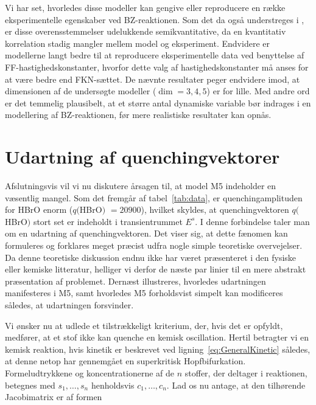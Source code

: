 Vi har set, hvorledes disse model\-ler kan gengive eller
reproducere en r{\ae}kke eksperimentelle egenskaber ved
BZ-reaktionen. Som det da ogs{\aa} understreges i
\cite{HopfQuench}, er disse overensstemmelser udelukkende
semikvantitative, da en kvantitativ korrelation stadig
mangler mellem model og eksperiment. Endvidere er
model\-lerne langt bedre til at reproducere eksperimentelle
data ved benyttelse af FF-hastighedskonstanter, hvorfor
dette valg af hastighedskonstanter m{\aa} anses for at
v{\ae}re bedre end FKN-s{\ae}ttet. De n{\ae}vnte resultater
peger endvidere imod, at dimensionen af de unders{\o}gte
model\-ler ($\dim = 3,4,5$) er for lille. Med andre ord er
det temmelig plausibelt, at et st{\o}rre antal dynamiske
variable b{\o}r indrages i en model\-lering af
BZ-reaktionen, f{\o}r mere realistiske resultater kan
opn{\aa}s.

\section{Udartning af quenchingvektorer}
\label{sec:QuenchUdart}
Afslutningsvis vil vi nu diskutere {\aa}rsagen til, at
model M5 indeholder en v{\ae}sentlig mangel. Som det
fremg{\aa}r af tabel~\ref{tab:data}, er quenchingamplituden
for HBrO enorm ($q($HBrO$)$ $= 20900$), hvilket skyldes, at
quenchingvektoren $q($HBrO$)$ stort set er indeholdt i
transientrummet $E^s$. I denne forbindelse taler man om en
udartning af quenchingvektoren. Det viser sig, at dette
f{\ae}nomen kan formuleres og forklares meget pr{\ae}cist
udfra nogle simple teoretiske over\-vejelser. Da denne
teoretiske diskussion endnu ikke har v{\ae}ret
pr{\ae}senteret i den fysiske eller kemiske litteratur,
helliger vi derfor de n{\ae}ste par linier til en mere
abstrakt pr{\ae}sentation af problemet. Dern{\ae}st
illustreres, hvorledes udartningen manifesteres i M5, samt
hvorledes M5 forholdsvist simpelt kan modificeres
s{\aa}ledes, at udartningen forsvinder.

\vspace{4.0mm}
Vi {\o}nsker nu at udlede et tilstr{\ae}kkeligt kriterium,
der, hvis det er opfyldt, medf{\o}rer, at et stof ikke kan
quenche en kemisk oscillation. Hertil betragter vi en
kemisk reaktion, hvis kinetik er beskrevet ved
lig\-ning~\ref{eq:GeneralKinetic} s{\aa}ledes, at denne
net\-op har gennemg{\aa}et en superkritisk Hopfbifurkation.
Formel\-udtrykkene og koncentrationerne af de $n$ stoffer,
der deltager i reaktionen, betegnes med $s_1,\ldots,s_n$
henholdsvis $c_1,\ldots,c_n$. Lad os nu antage, at den
tilh{\o}rende Jacobimatrix er af formen


